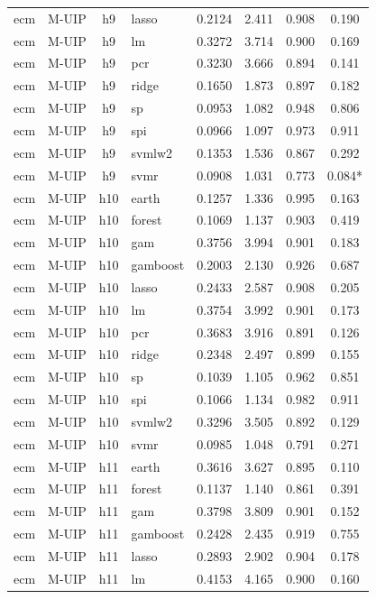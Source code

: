 \begin{ThreePartTable}
\begin{longtable}[t]{llclcccc}
ecm & M-UIP & h9 & lasso & 0.2124 & 2.411 & 0.908 & 0.190\\
ecm & M-UIP & h9 & lm & 0.3272 & 3.714 & 0.900 & 0.169\\
ecm & M-UIP & h9 & pcr & 0.3230 & 3.666 & 0.894 & 0.141\\
ecm & M-UIP & h9 & ridge & 0.1650 & 1.873 & 0.897 & 0.182\\
ecm & M-UIP & h9 & sp & 0.0953 & 1.082 & 0.948 & 0.806\\
ecm & M-UIP & h9 & spi & 0.0966 & 1.097 & 0.973 & 0.911\\
ecm & M-UIP & h9 & svmlw2 & 0.1353 & 1.536 & 0.867 & 0.292\\
ecm & M-UIP & h9 & svmr & 0.0908 & 1.031 & 0.773 & 0.084*\\
\addlinespace
ecm & M-UIP & h10 & earth & 0.1257 & 1.336 & 0.995 & 0.163\\
ecm & M-UIP & h10 & forest & 0.1069 & 1.137 & 0.903 & 0.419\\
ecm & M-UIP & h10 & gam & 0.3756 & 3.994 & 0.901 & 0.183\\
ecm & M-UIP & h10 & gamboost & 0.2003 & 2.130 & 0.926 & 0.687\\
ecm & M-UIP & h10 & lasso & 0.2433 & 2.587 & 0.908 & 0.205\\
ecm & M-UIP & h10 & lm & 0.3754 & 3.992 & 0.901 & 0.173\\
ecm & M-UIP & h10 & pcr & 0.3683 & 3.916 & 0.891 & 0.126\\
ecm & M-UIP & h10 & ridge & 0.2348 & 2.497 & 0.899 & 0.155\\
ecm & M-UIP & h10 & sp & 0.1039 & 1.105 & 0.962 & 0.851\\
ecm & M-UIP & h10 & spi & 0.1066 & 1.134 & 0.982 & 0.911\\
ecm & M-UIP & h10 & svmlw2 & 0.3296 & 3.505 & 0.892 & 0.129\\
ecm & M-UIP & h10 & svmr & 0.0985 & 1.048 & 0.791 & 0.271\\
\addlinespace
ecm & M-UIP & h11 & earth & 0.3616 & 3.627 & 0.895 & 0.110\\
ecm & M-UIP & h11 & forest & 0.1137 & 1.140 & 0.861 & 0.391\\
ecm & M-UIP & h11 & gam & 0.3798 & 3.809 & 0.901 & 0.152\\
ecm & M-UIP & h11 & gamboost & 0.2428 & 2.435 & 0.919 & 0.755\\
ecm & M-UIP & h11 & lasso & 0.2893 & 2.902 & 0.904 & 0.178\\
ecm & M-UIP & h11 & lm & 0.4153 & 4.165 & 0.900 & 0.160\\

\end{longtable}
\end{ThreePartTable}

